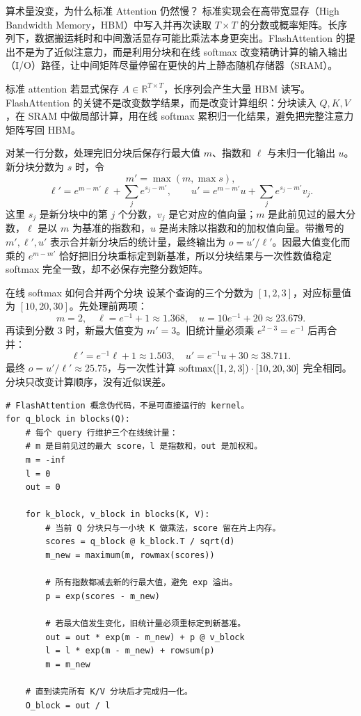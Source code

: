 \begin{motivationbox}{算术量没变，为什么标准 Attention 仍然慢？}
标准实现会在高带宽显存（High Bandwidth Memory，HBM）中写入并再次读取 $T\times T$ 的分数或概率矩阵。长序列下，数据搬运耗时和中间激活显存可能比乘法本身更突出。FlashAttention 的提出不是为了近似注意力，而是利用分块和在线 softmax 改变精确计算的输入输出（I/O）路径，让中间矩阵尽量停留在更快的片上静态随机存储器（SRAM）。
\end{motivationbox}

标准 attention 若显式保存 $A\in\mathbb R^{T\times T}$，长序列会产生大量 HBM 读写。FlashAttention 的关键不是改变数学结果，而是改变计算组织：分块读入 $Q,K,V$，在 SRAM 中做局部计算，用在线 softmax 累积归一化结果，避免把完整注意力矩阵写回 HBM。

\begin{mathbox}
对某一行分数，处理完旧分块后保存行最大值 $m$、指数和 $\ell$ 与未归一化输出 $u$。新分块分数为 $s$ 时，令
\[
m'=\max(m,\max s),
\]
\[
\ell'=e^{m-m'}\ell+\sum_j e^{s_j-m'},\qquad
u'=e^{m-m'}u+\sum_j e^{s_j-m'}v_j.
\]
这里 $s_j$ 是新分块中的第 $j$ 个分数，$v_j$ 是它对应的值向量；$m$ 是此前见过的最大分数，$\ell$ 是以 $m$ 为基准的指数和，$u$ 是尚未除以指数和的加权值向量。带撇号的 $m',\ell',u'$ 表示合并新分块后的统计量，最终输出为 $o=u'/\ell'$。因最大值变化而乘的 $e^{m-m'}$ 恰好把旧分块重标定到新基准，所以分块结果与一次性数值稳定 softmax 完全一致，却不必保存完整分数矩阵。
\end{mathbox}

\begin{examplebox}{在线 softmax 如何合并两个分块}
设某个查询的三个分数为 $[1,2,3]$，对应标量值为 $[10,20,30]$。先处理前两项：
\[
m=2,\quad \ell=e^{-1}+1\approx1.368,
\quad u=10e^{-1}+20\approx23.679.
\]
再读到分数 $3$ 时，新最大值变为 $m'=3$。旧统计量必须乘 $e^{2-3}=e^{-1}$ 后再合并：
\[
\ell'=e^{-1}\ell+1\approx1.503,
\quad u'=e^{-1}u+30\approx38.711.
\]
最终 $o=u'/\ell'\approx25.75$，与一次性计算
$\operatorname{softmax}([1,2,3])\cdot[10,20,30]$ 完全相同。分块只改变计算顺序，没有近似误差。
\end{examplebox}

\begin{lstlisting}
# FlashAttention 概念伪代码，不是可直接运行的 kernel。
for q_block in blocks(Q):
    # 每个 query 行维护三个在线统计量：
    # m 是目前见过的最大 score，l 是指数和，out 是加权和。
    m = -inf
    l = 0
    out = 0

    for k_block, v_block in blocks(K, V):
        # 当前 Q 分块只与一小块 K 做乘法，score 留在片上内存。
        scores = q_block @ k_block.T / sqrt(d)
        m_new = maximum(m, rowmax(scores))

        # 所有指数都减去新的行最大值，避免 exp 溢出。
        p = exp(scores - m_new)

        # 若最大值发生变化，旧统计量必须重标定到新基准。
        out = out * exp(m - m_new) + p @ v_block
        l = l * exp(m - m_new) + rowsum(p)
        m = m_new

    # 直到读完所有 K/V 分块后才完成归一化。
    O_block = out / l
\end{lstlisting}

